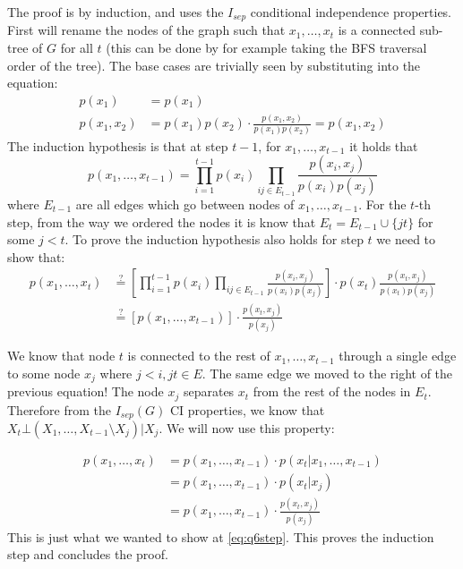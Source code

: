 \documentclass[11pt]{article}
\begin{document}
The proof is by induction, and uses the $I_{sep}$ conditional independence properties.
First will rename the nodes of the graph such that $x_1,\ldots,x_t$ is a connected sub-tree of $G$ for all $t$ (this can be done by for example taking the BFS traversal order of the tree).
The base cases are trivially seen by substituting into the equation:
\begin{align}
p(x_1) &= p(x_1) \\
p(x_1, x_2) &= p(x_1)p(x_2) \cdot \frac{p(x_1, x_2)}{p(x_1)p(x_2)} = p(x_1, x_2)
\end{align}
The induction hypothesis is that at step $t-1$, for $x_1,\ldots,x_{t-1}$ it holds that
\begin{equation}
p(x_1,\ldots,x_{t-1}) = \prod_{i=1}^{t-1}p(x_i) \prod_{ij\in E_{t-1}}\frac{p(x_i,x_j)}{p(x_i)p(x_j)}
\end{equation}
where $E_{t-1}$ are all edges which go between nodes of $x_1,\ldots,x_{t-1}$.
For the $t$-th step, from the way we ordered the nodes it is know that $E_t = E_{t-1}\cup\{jt\}$ for some $j < t$. To prove the induction hypothesis also holds for step $t$ we need to show that:
\begin{align}
p(x_1,\ldots,x_{t}) &\stackrel{?}{=} \left[ \prod_{i=1}^{t-1}p(x_i) \prod_{ij\in E_{t-1}}\frac{p(x_i,x_j)}{p(x_i)p(x_j)} \right] \cdot p(x_t)\frac{p(x_t,x_j)}{p(x_t)p(x_j)}\\
&\stackrel{?}{=} \left[p(x_1,\ldots,x_{t-1})\right] \cdot \frac{p(x_t,x_j)}{p(x_j)} \label{eq:q6step}
\end{align}

We know that node $t$ is connected to the rest of $x_1,\ldots,x_{t-1}$ through a single edge to some node $x_j$ where $j < i, jt\in E$.
The same edge we moved to the right of the previous equation!
The node $x_j$ separates $x_t$ from the rest of the nodes in $E_t$.
Therefore from the $I_{sep}(G)$ CI properties, we know that $X_t \bot (X_1,\ldots,X_{t-1}\setminus X_j) | X_j$. We will now use this property:

\begin{align}
p(x_1,\ldots,x_t) &= p(x_1,\ldots,x_{t-1})\cdot p(x_t | x_1,\ldots,x_{t-1}) \\
& = p(x_1,\ldots,x_{t-1})\cdot p(x_t | x_j)\\
& = p(x_1,\ldots,x_{t-1})\cdot \frac{p(x_t,x_j)}{p(x_j)}
\end{align}
This is just what we wanted to show at \eqref{eq:q6step}.
This proves the induction step and concludes the proof.
\end{document}
